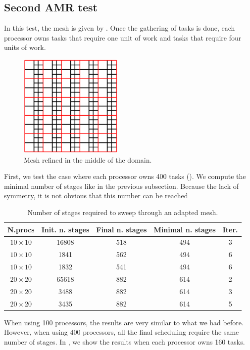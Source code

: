 \documentclass[letterpaper]{article}
\renewcommand{\(}{\left(}
\renewcommand{\)}{\right)}
\renewcommand{\[}{\left[}
\renewcommand{\]}{\right]}
\begin{document}
\subsection{Second AMR test}
In this test, the mesh is given by . Once the gathering of tasks is
done, each processor owns tasks that require one unit of work and tasks that
require four units of work.
\begin{figure}[H]
  \centering
  \includegraphics[width=5cm]{mesh_2}
  \caption{Mesh refined in the middle of the domain.}
  \label{mesh_2}
\end{figure}

First, we test the case where each processor owns 400 tasks ().
We compute the minimal number of stages like in the previous subsection. Because
the lack of symmetry, it is not obvious that this number can be reached
\begin{table}[H]
  \begin{center}
    \begin{tabular}{|c|c|c|c|c|}
      \hline
      N.procs & Init. n. stages & Final n. stages & Minimal n. stages & Iter. \\
      \hline
      $10 \times 10$ & 16808 & 518 & 494 & 3 \\
      $10 \times 10$ &  1841 & 562 & 494 & 6 \\
      $10 \times 10$ &  1832 & 541 & 494 & 6 \\
      $20 \times 20$ & 65618 & 882 & 614 & 2 \\
      $20 \times 20$ &  3488 & 882 & 614 & 3 \\
      $20 \times 20$ &  3435 & 882 & 614 & 5 \\
      \hline
    \end{tabular}
    \caption{Number of stages required to sweep through an adapted mesh.}
    \label{band_1}
  \end{center}
\end{table}

When using 100 processors, the results are very similar to what we had before.
However, when using 400 processors, all the final scheduling 
require the same number of stages. In , we show the results when
each processor owns 160 tasks.
\end{document}
